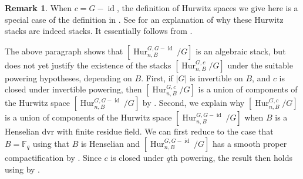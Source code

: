 \documentclass[12 pt]{amsart}
\theoremstyle{plain}
\theoremstyle{definition}
\newtheorem{remark}[theorem]{Remark}
\theoremstyle{remark}
\numberwithin{equation}{section}
\DeclareMathOperator\id{id}
\DeclareMathOperator\spec{Spec}
\DeclareMathOperator\gal{Gal}
\newcommand{\hur}[4]{[\operatorname{Hur}^{#1, #3}_{#2,#4}/#1]}
\begin{document}
\begin{remark}
	\label{remark:}
	When $c = G - \id$, the definition of Hurwitz spaces we give here is a special case of the
definition in \cite[Definition
2.4.2]{ellenbergL:homological-stability-for-generalized-hurwitz-spaces}. 
See \cite[Remark
2.4.3]{ellenbergL:homological-stability-for-generalized-hurwitz-spaces} for an
explanation of why these Hurwitz stacks are indeed stacks. It essentially
follows from
\cite[\S1.3.2 and Appendix B]{abramovichCV:twisted-bundles}.

The above paragraph shows that
$\hur G n {G-\id} B$ is an algebraic stack, but does not yet justify the
existence of the stacks
$\hur G n c B$ under the suitable powering hypotheses, depending on $B$.
First, if $|G|$ is invertible on $B$, and $c$ is closed under
invertible powering,
then
$\hur G n c B$ is a union of components of
the Hurwitz space
$\hur G n {G-\id} B$
by
\cite[Corollary
12.2]{liuWZB:a-predicted-distribution}.
Second, we explain why
$\hur G n c B$ is a union of components of
the Hurwitz space
$\hur G n {G-\id} B$
when $B$ is a Henselian dvr with finite
residue field.
We can first reduce to the case that $B = \mathbb F_q$ using that $B$ is Henselian 
and 
$\hur G n {G-\id} B$ has a smooth proper compactification by
\cite[Corollary B.1.4]{ellenbergL:homological-stability-for-generalized-hurwitz-spaces}.
Since $c$ is closed under $q$th powering, 
the result then holds using by
\cite[Theorem 12.1(2)]{liuWZB:a-predicted-distribution}.

\end{remark}
\end{document}
